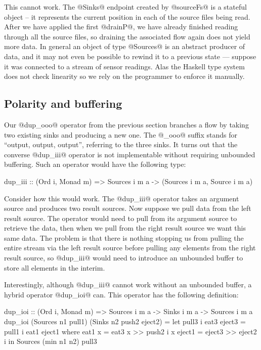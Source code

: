 This cannot work. The @Sinks@ endpoint created by @sourceFs@ is a stateful object -- it represents the current position in each of the source files being read. After we have applied the first @drainP@, we have already finished reading through all the source files, so draining the associated flow again does not yield more data. In general an object of type @Sources@ is an abstract producer of data, and it may not even be possible to rewind it to a previous state --- suppose it was connected to a stream of sensor readings. Alas the Haskell type system does not check linearity so we rely on the programmer to enforce it manually.


\subsection{Polarity and buffering}
\label{s:Polarity}
Our @dup_ooo@ operator from the previous section branches a flow by taking two existing sinks and producing a new one. The @_ooo@ suffix stands for ``output, output, output'', referring to the three sinks. It turns out that the converse @dup_iii@ operator is not implementable without requiring unbounded buffering. Such an operator would have the following type:
\vspace{-0.5ex}
\begin{code}
 dup_iii :: (Ord i, Monad m)
         =>  Sources i m a 
         -> (Sources i m a, Source i m a)
\end{code}

Consider how this would work. The @dup_iii@ operator takes an argument source and produces two result sources. Now suppose we pull data from the left result source. The operator would need to pull from its argument source to retrieve the data, then when we pull from the right result source we want this same data. The problem is that there is nothing stopping us from pulling the entire stream via the left result source before pulling any elements from the right result source, so @dup_iii@ would need to introduce an unbounded buffer to store all elements in the interim.

Interestingly, although @dup_iii@ cannot work without an unbounded buffer, a hybrid operator @dup_ioi@ can. This operator has the following definition:
\begin{code}
dup_ioi :: (Ord i, Monad m)
        => Sources i m a -> Sinks i m a 
        -> Sources i m a
dup_ioi (Sources n1 pull1) (Sinks n2 push2 eject2)
 = let pull3 i eat3 eject3
        = pull1 i eat1 eject1
        where eat1 x = eat3 x >> push2  i x
              eject1 = eject3 >> eject2 i
   in  Sources (min n1 n2) pull3
\end{code}

